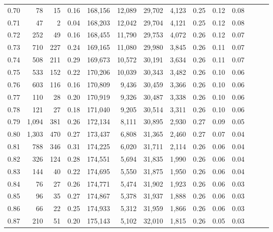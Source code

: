 \begin{tabular}{rrrrrrrrrrrrrr}
0.70 &      78 &     15 &  0.16 &  168,156 &   12,089 &  29,702 &   4,123 &  0.25 &  0.12 &      0.08 \\
0.71 &      47 &      2 &  0.04 &  168,203 &   12,042 &  29,704 &   4,121 &  0.25 &  0.12 &      0.08 \\
0.72 &     252 &     49 &  0.16 &  168,455 &   11,790 &  29,753 &   4,072 &  0.26 &  0.12 &      0.07 \\
0.73 &     710 &    227 &  0.24 &  169,165 &   11,080 &  29,980 &   3,845 &  0.26 &  0.11 &      0.07 \\
0.74 &     508 &    211 &  0.29 &  169,673 &   10,572 &  30,191 &   3,634 &  0.26 &  0.11 &      0.07 \\
0.75 &     533 &    152 &  0.22 &  170,206 &   10,039 &  30,343 &   3,482 &  0.26 &  0.10 &      0.06 \\
0.76 &     603 &    116 &  0.16 &  170,809 &    9,436 &  30,459 &   3,366 &  0.26 &  0.10 &      0.06 \\
0.77 &     110 &     28 &  0.20 &  170,919 &    9,326 &  30,487 &   3,338 &  0.26 &  0.10 &      0.06 \\
0.78 &     121 &     27 &  0.18 &  171,040 &    9,205 &  30,514 &   3,311 &  0.26 &  0.10 &      0.06 \\
0.79 &   1,094 &    381 &  0.26 &  172,134 &    8,111 &  30,895 &   2,930 &  0.27 &  0.09 &      0.05 \\
0.80 &   1,303 &    470 &  0.27 &  173,437 &    6,808 &  31,365 &   2,460 &  0.27 &  0.07 &      0.04 \\
0.81 &     788 &    346 &  0.31 &  174,225 &    6,020 &  31,711 &   2,114 &  0.26 &  0.06 &      0.04 \\
0.82 &     326 &    124 &  0.28 &  174,551 &    5,694 &  31,835 &   1,990 &  0.26 &  0.06 &      0.04 \\
0.83 &     144 &     40 &  0.22 &  174,695 &    5,550 &  31,875 &   1,950 &  0.26 &  0.06 &      0.04 \\
0.84 &      76 &     27 &  0.26 &  174,771 &    5,474 &  31,902 &   1,923 &  0.26 &  0.06 &      0.03 \\
0.85 &      96 &     35 &  0.27 &  174,867 &    5,378 &  31,937 &   1,888 &  0.26 &  0.06 &      0.03 \\
0.86 &      66 &     22 &  0.25 &  174,933 &    5,312 &  31,959 &   1,866 &  0.26 &  0.06 &      0.03 \\
0.87 &     210 &     51 &  0.20 &  175,143 &    5,102 &  32,010 &   1,815 &  0.26 &  0.05 &      0.03 \\

\end{tabular}
